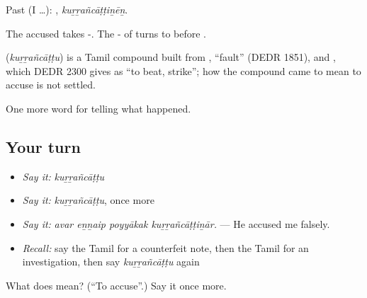 Past (I …): , \emph{kuṟṟañcāṭṭiṉēṉ}.

The accused takes -. The - of  turns to  before .

\begin{cousinweb}
\textbf{} (\emph{kuṟṟañcāṭṭu}) is a Tamil compound built from , \textquotedblleft{}fault\textquotedblright{} (DEDR 1851), and , which DEDR 2300 gives as \textquotedblleft{}to beat, strike\textquotedblright{}; how the compound came to mean to accuse is not settled.
\end{cousinweb}

\begin{grammarlens}[title={What you've built}]
One more word for telling what happened.
\end{grammarlens}

\subsection*{Your turn}
\begin{itemize}
\raggedright
  \item \emph{Say it:} \emph{kuṟṟañcāṭṭu}
  \item \emph{Say it:} \emph{kuṟṟañcāṭṭu}, once more
  \item \emph{Say it:} \emph{avar eṉṉaip poyyākak kuṟṟañcāṭṭiṉār.} — He accused me falsely.
  \item \emph{Recall:} say the Tamil for a counterfeit note, then the Tamil for an investigation, then say \emph{kuṟṟañcāṭṭu} again
\end{itemize}

\begin{tcolorbox}[breakable,colback=teal!4,colframe=teal!35!black,title={Before you move on}]
What does  mean? (\textquotedblleft{}To accuse\textquotedblright{}.) Say it once more.
\end{tcolorbox}
